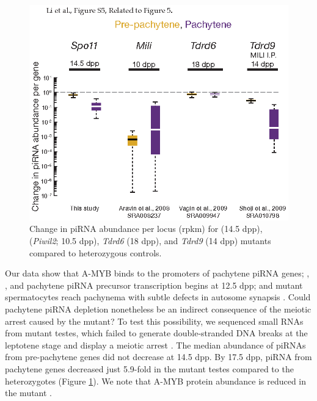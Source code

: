     \begin{figure} %
      \centering 
      \includegraphics{Figures/MolCel/MolCel2013_FigS5.eps}
      \caption[Change in piRNA Expression in \spo{}, \miwi{}, \textit{Tdrd6}, and \textit{Tdrd9} Mutants]
      {
      Change in piRNA abundance per locus (rpkm) for \spo{} (14.5 dpp), \miwi{} (\textit{Piwil2}; 10.5 dpp), \textit{Tdrd6} (18 dpp), and \textit{Tdrd9} (14 dpp) mutants compared to heterozygous controls.
      }
      \label{MolCel:fig:MolCelS5}
 	   \end{figure}

    Our data show that A-MYB binds to the promoters of pachytene piRNA genes; \amyb{}, \miwi{}, and pachytene piRNA precursor transcription begins at 12.5 dpp; and \amyb{} mutant spermatocytes reach pachynema with subtle defects in autosome synapsis \citep{Bolcun-Filas2011}. Could pachytene piRNA depletion nonetheless be an indirect consequence of the meiotic arrest caused by the \amyb{} mutant? To test this possibility, we sequenced small RNAs from \spo{} mutant testes, which failed to generate double-stranded DNA breaks at the leptotene stage and display a meiotic arrest \citep{Baudat2000c,Romanienko2000}. The median abundance of piRNAs from pre-pachytene genes did not decrease at 14.5 dpp. By 17.5 dpp, piRNA from pachytene genes decreased just 5.9-fold in the \spo{} mutant testes compared to the heterozygotes (Figure \ref{MolCel:fig:MolCelS5}). We note that A-MYB protein abundance is reduced in the \spo{} mutant \citep{Bolcun-Filas2011}.

